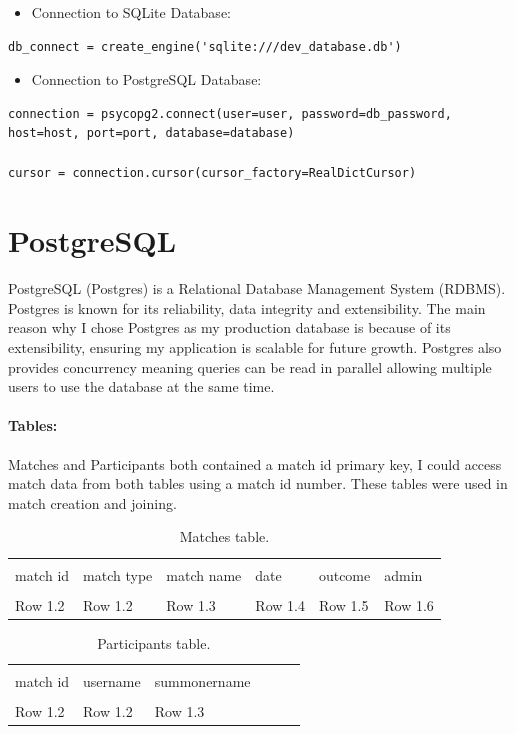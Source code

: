 \newpage
\begin{itemize}
	\item Connection to SQLite Database:
\end{itemize}

 \begin{verbatim}
db_connect = create_engine('sqlite:///dev_database.db')
\end{verbatim}

\begin{itemize}
	\item Connection to PostgreSQL Database:
\end{itemize}

\begin{verbatim}
connection = psycopg2.connect(user=user, password=db_password, host=host, port=port, database=database)

cursor = connection.cursor(cursor_factory=RealDictCursor)
\end{verbatim}
\section{PostgreSQL}
PostgreSQL (Postgres) is a Relational Database Management System (RDBMS). 
\cite{postgresql1996postgresql} Postgres is known for its reliability, data integrity and extensibility. The main reason why I chose Postgres as my production database is because of its extensibility, ensuring my application is scalable for future growth. Postgres also provides concurrency meaning queries can be read in parallel allowing multiple users to use the database at the same time.
\paragraph{Tables:}Matches and Participants both contained a match id primary key, I could access match data from both tables using a match id number. These tables were used in match creation and joining.
\begin{table}[h]
	\centering
	\begin{tabular}{llllll}
		\toprule \\
		match id & match type & match name & date & outcome & admin \\
		\midrule \\
		Row 1.2  & Row 1.2    & Row 1.3    & Row 1.4 & Row 1.5 & Row 1.6\\
		\bottomrule
	\end{tabular}
	\caption{Matches table.}
	\label{table:Matches}
\end{table}
\begin{table}[h]
	\centering
	\begin{tabular}{llllll}
		\toprule \\
		match id & username & summonername \\
		\midrule \\
		Row 1.2  & Row 1.2  & Row 1.3  \\
		\bottomrule
	\end{tabular}
	\caption{Participants table.}
	\label{table:Matches}
\end{table}

